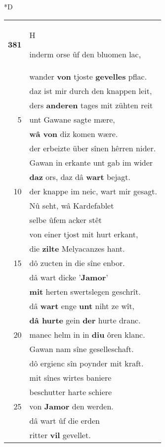 \documentclass[8pt,a4paper,notitlepage]{article}
\begin{document}
\begin{table}[ht]
\begin{minipage}[t]{0.5\linewidth}
\small
\begin{center}*D
\end{center}
\begin{tabular}{rl}
\textbf{381} & \begin{large}H\end{large}inderm orse ûf den bluomen lac,\\ 
 & wander \textbf{von} tjoste \textbf{gevelles} pflac.\\ 
 & daz ist mir durch den knappen leit,\\ 
 & ders \textbf{anderen} tages mit zühten reit\\ 
5 & unt Gawane sagte mære,\\ 
 & \textbf{wâ von} diz komen wære.\\ 
 & der erbeizte über sînen hêrren nider.\\ 
 & Gawan in erkante unt gab im wider\\ 
 & \textbf{daz} ors, daz dâ \textbf{wart} bejagt.\\ 
10 & der knappe im neic, wart mir gesagt.\\ 
 & Nû seht, wâ Kardefablet\\ 
 & selbe ûfem acker stêt\\ 
 & von einer tjost mit hurt erkant,\\ 
 & die \textbf{zilte} Melyacanzes hant.\\ 
15 & dô zucten in die sîne enbor.\\ 
 & dâ wart dicke '\textbf{Jamor}'\\ 
 & \textbf{mit} herten swertslegen geschrît.\\ 
 & dâ \textbf{wart} enge \textbf{unt} niht ze wît,\\ 
 & \textbf{dâ hurte} gein \textbf{der} hurte dranc.\\ 
20 & manec helm in in \textbf{diu} ôren klanc.\\ 
 & Gawan nam sîne geselleschaft.\\ 
 & dô ergienc sîn poynder mit kraft.\\ 
 & mit sînes wirtes baniere\\ 
 & beschutter harte schiere\\ 
25 & von \textbf{Jamor} den werden.\\ 
 & dâ wart ûf die erden\\ 
 & ritter \textbf{vil} gevellet.\\ 

\end{tabular}
\end{minipage}
\end{table}
\end{document}
